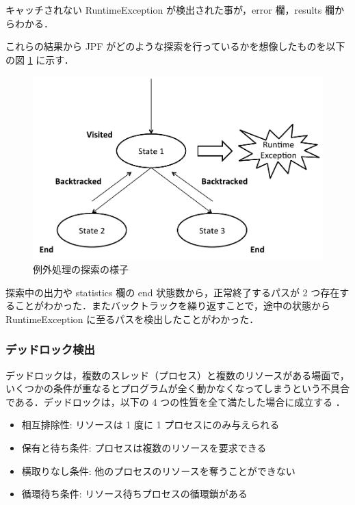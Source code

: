 \documentclass[a4j,12pt]{jarticle}
\begin{document}
キャッチされない RuntimeException が検出された事が，error 欄，results 欄からわかる．

これらの結果から JPF がどのような探索を行っているかを想像したものを以下の図 \ref{figure:exception-search} に示す．

\begin{figure}[here]
\centering
\includegraphics[width=12cm]{images/exception-search.pdf}
\caption{例外処理の探索の様子}
\label{figure:exception-search}
\end{figure}

探索中の出力や statistics 欄の end 状態数から，正常終了するパスが 2 つ存在することがわかった．またバックトラックを繰り返すことで，途中の状態から RuntimeException に至るパスを検出したことがわかった．

\subsubsection{デッドロック検出}

デッドロックは，複数のスレッド（プロセス）と複数のリソースがある場面で，いくつかの条件が重なるとプログラムが全く動かなくなってしまうという不具合である．デッドロックは，以下の 4 つの性質を全て満たした場合に成立する \cite{DBLP:journals/csur/CoffmanES71} \cite{MOS2}．

\begin{itemize}
\item 相互排除性: リソースは 1 度に 1 プロセスにのみ与えられる
\item 保有と待ち条件: プロセスは複数のリソースを要求できる
\item 横取りなし条件: 他のプロセスのリソースを奪うことができない
\item 循環待ち条件: リソース待ちプロセスの循環鎖がある
\end{itemize}
\end{document}
